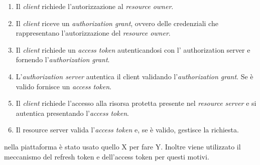 \begin{enumerate}
    \item Il \textit{client} richiede l'autorizzazione al \textit{resource owner}.
    \item Il \textit{client} riceve un \textit{authorization grant}, ovvero delle credenziali che rappresentano l'autorizzazione del \textit{resource owner}.
    \item Il \textit{client} richiede un \textit{access token} autenticandosi con l' authorization server e fornendo l'\textit{authorization grant}.
    \item L'\textit{authorization server} autentica il client validando l'\textit{authorization grant}. Se è valido fornisce un \textit{access token}.
    \item Il \textit{client} richiede l'accesso alla risorsa protetta presente nel \textit{resource server} e si autentica presentando l'\textit{access token}.
    \item Il resource server valida l'\textit{access token} e, se è valido, gestisce la richiesta.
\end{enumerate}



nella piattaforma è stato usato quello X per fare Y.
Inoltre viene utilizzato il meccanismo del refresh token e dell'access token per questi motivi.

